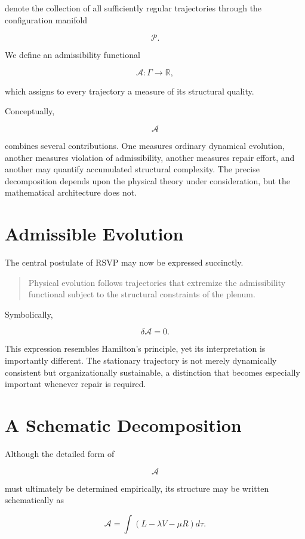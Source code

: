 \documentclass[11pt,oneside]{book}
\numberwithin{equation}{chapter}
\theoremstyle{definition}
\theoremstyle{plain}
\begin{document}
denote the collection of all sufficiently regular trajectories through the
configuration manifold

\[
\mathcal P.
\]

We define an admissibility functional

\[
\mathcal A :
\Gamma
\rightarrow
\mathbb R,
\]

which assigns to every trajectory a measure of its structural quality.

Conceptually,

\[
\mathcal A
\]

combines several contributions. One measures ordinary dynamical evolution, another measures violation of admissibility, another measures repair effort, and another may quantify accumulated structural complexity. The precise decomposition depends upon the physical theory under consideration, but the mathematical architecture does not.

\section{Admissible Evolution}

The central postulate of RSVP may now be expressed succinctly.

\begin{quote}
Physical evolution follows trajectories that extremize the admissibility
functional subject to the structural constraints of the plenum.
\end{quote}

Symbolically,

\[
\delta\mathcal A =0.
\]

This expression resembles Hamilton's principle, yet its interpretation is importantly different. The stationary trajectory is not merely dynamically consistent but organizationally sustainable, a distinction that becomes especially important whenever repair is required.

\section{A Schematic Decomposition}

Although the detailed form of

\[
\mathcal A
\]

must ultimately be determined empirically, its structure may be written
schematically as

\[
\mathcal A
=
\int
\left(
L
-
\lambda V
-
\mu R
\right)
d\tau.
\]
\end{document}

